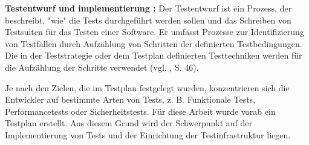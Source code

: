 \textbf{Testentwurf und implementierung :} Der Testentwurf ist ein Prozess,
der beschreibt, "wie" die Tests durchgef\"uhrt werden sollen und das
Schreiben von Testsuiten f\"ur das Testen einer Software. Er umfasst Prozesse
zur Identifizierung von Testf\"allen durch Aufz\"ahlung von Schritten der
definierten Testbedingungen. Die in der Teststrategie oder dem Testplan
definierten Testtechniken werden f\"ur die Aufz\"ahlung
der Schritte verwendet (vgl. \cite{shultz2011software}, S. 46).



Je nach den Zielen, die im Testplan festgelegt wurden, konzentrieren sich die
Entwickler auf bestimmte Arten von Tests, z. B. Funktionale Tests,
Performancetests oder Sicherheitstests. F\"ur diese Arbeit wurde vorab ein
Testplan erstellt. Aus diesem Grund wird der Schwerpunkt auf der Implementierung
von Tests und der Einrichtung der Testinfrastruktur liegen.

